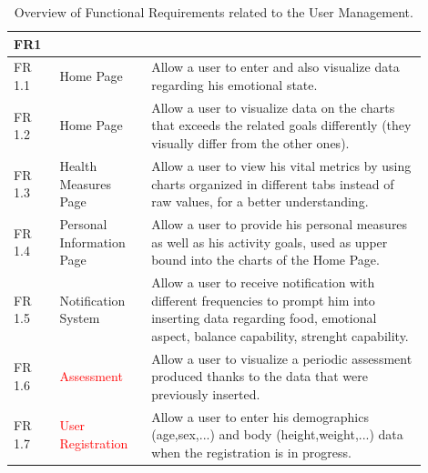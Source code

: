 \begin{table}[h!]
    \centering
    \begin{tabular}{|>{\raggedright\arraybackslash}p{0.1\linewidth}|>{\raggedright\arraybackslash}p{0.2\linewidth}|>{\raggedright\arraybackslash}p{0.6\linewidth}|}
        \hline
        \textbf{FR1} & \multicolumn{2}{>{\centering\arraybackslash}p{0.7\linewidth}|}{\textbf{User Management}} \\
        \hline
        FR 1.1 & Home Page & Allow a user to enter and also visualize data regarding his emotional state. \\
        \hline
        FR 1.2 & Home Page & Allow a user to visualize data on the charts that exceeds the related goals differently (they visually differ from the other ones). \\
        \hline
        FR 1.3 & Health Measures Page & Allow a user to view his vital metrics by using charts organized in different tabs instead of raw values, for a better understanding. \\
        \hline
        FR 1.4 & Personal Information Page & Allow a user to provide his personal measures as well as his activity goals, used as upper bound into the charts of the Home Page. \\
        \hline
        FR 1.5 & Notification System & Allow a user to receive notification with different frequencies to prompt him into inserting data regarding food, emotional aspect, balance capability, strenght capability. \\
        \hline
        FR 1.6 & \textcolor{red}{Assessment} & Allow a user to visualize a periodic assessment produced thanks to the data that were previously inserted. \\
        \hline
        FR 1.7 & \textcolor{red}{User Registration} & Allow a user to enter his demographics (age,sex,...) and body (height,weight,...) data when the registration is in progress. \\
        \hline
    \end{tabular}
    \caption{Overview of Functional Requirements related to the User Management.}
\end{table}

\newpage


